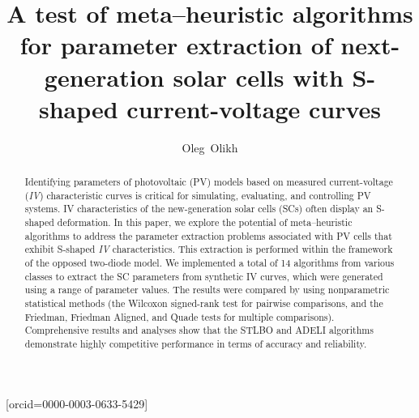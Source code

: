\documentclass[a4paper,fleqn]{cas-sc}
\begin{document}
\let\WriteBookmarks\relax
\def\floatpagepagefraction{1}
\def\textpagefraction{.001}




\title [mode = title]{A test of meta--heuristic algorithms for parameter extraction of next-generation solar cells with S-shaped current-voltage curves}

\author{Oleg~Olikh}[orcid=0000-0003-0633-5429]






\begin{abstract}
Identifying parameters of photovoltaic (PV) models based on measured current-voltage (\emph{IV}) characteristic curves is critical for simulating, evaluating, and controlling PV systems.
IV characteristics of the new-generation solar cells (SCs) often display an S-shaped deformation.
In this paper, we explore the potential of meta--heuristic algorithms to address the parameter extraction problems associated with PV cells that exhibit S-shaped \emph{IV} characteristics.
This extraction is performed within the framework of the opposed two-diode model.
We implemented a total of 14 algorithms from various classes to extract the SC parameters from synthetic IV curves, which were generated using a range of parameter values.
The results were compared by using nonparametric statistical methods (the Wilcoxon signed-rank test for pairwise comparisons, and the Friedman, Friedman Aligned, and Quade tests for multiple comparisons).
Comprehensive results and analyses show that the STLBO and ADELI algorithms demonstrate highly competitive performance in terms of accuracy and reliability.
\end{abstract}
\end{document}
